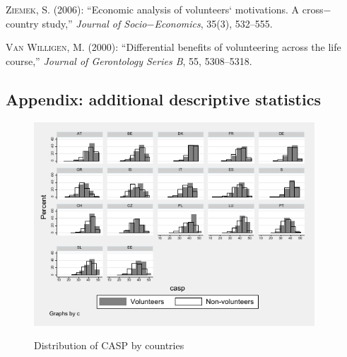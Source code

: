 \documentclass[10pt, letterpaper]{article}
\begin{document}
\begin{spacing}{1.4}
\begin{thebibliography}{87}
\textsc{Ziemek, S.} (2006): \enquote{Economic analysis of volunteers` motivations. A cross$-$country study,} \emph{Journal of Socio$-$Economics}, 35(3), 532--555.


\textsc{Van Willigen, M.} (2000): \enquote{Differential benefits of volunteering across the life course,} \emph{Journal of Gerontology Series B}, 55, 5308--5318.


\end{thebibliography}


\begin{spacing}{.9}

\section{Appendix: additional descriptive statistics}


\begin{figure}[H]
 \includegraphics[height=3in]{hist_casp.pdf}
 \centering
 \label{fig:hist_casp}
\caption{Distribution of CASP by countries}
\end{figure}

%
%	 


%	 


\end{spacing}
\end{spacing}
\end{document}
